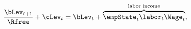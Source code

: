 \begin{equation}
\frac{\bLev_{t+1}}{\Rfree}+ \cLev_{t}=\bLev_{t}+\overbrace{\empState_{t} \labor_{t} \Wage_t}^{\text{labor income}},
\label{eq:ibc}
\end{equation}
